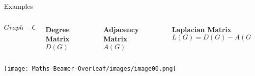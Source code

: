 \documentclass[aspectratio=169]{beamer}
\begin{document}
\begin{frame}{Examples}
\vspace{4mm}

\begin{columns}

\begin{column}{0.25\textwidth}
\centering \textbf{\(Graph - G\)}
\end{column}

\begin{column}{0.25\textwidth}
\centering \textbf{Degree Matrix}\\ \textbf{\(D(G)\)}
\end{column}

\begin{column}{0.25\textwidth}
\centering
\textbf{Adjacency Matrix}\\ \textbf{\(A(G)\)}
\end{column}

\begin{column}{0.25\textwidth}
\centering
\textbf{Laplacian Matrix}\\ \textbf{\(L(G) = D(G) - A(G)\)}
\end{column}

\end{columns}

\vspace{3mm}

\begin{columns}

\begin{column}{0.25\textwidth}
\centering
\texttt{[image: Maths-Beamer-Overleaf/images/image00.png]}
\end{column}

\begin{column}{0.25\textwidth}
\centering
\scriptsize
{}
\end{column}

\begin{column}{0.25\textwidth}
\centering
\scriptsize
{}
\end{column}


\end{columns}
\end{frame}
\end{document}
